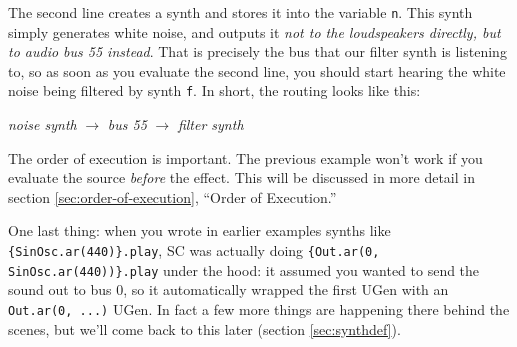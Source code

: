 The second line creates a synth and stores it into the variable \texttt{n}. This synth simply generates white noise, and outputs it \emph{not to the loudspeakers directly, but to audio bus 55 instead}. That is precisely the bus that our filter synth is listening to, so as soon as you evaluate the second line, you should start hearing the white noise being filtered by synth \texttt{f}.
In short, the routing looks like this:

\begin{center}
\emph{noise synth} $\rightarrow$ \emph{bus 55} $\rightarrow$ \emph{filter synth}
\end{center}

The order of execution is important. The previous example won't work if you evaluate the source \emph{before} the effect. This will be discussed in more detail in section \ref{sec:order-of-execution}, ``Order of Execution.''

One last thing: when you wrote in earlier examples synths like \texttt{\{SinOsc.ar(440)\}.play}, SC was actually doing \texttt{\{Out.ar(0, SinOsc.ar(440))\}.play} under the hood: it assumed you wanted to send the sound out to bus 0, so it automatically wrapped the first UGen with an \texttt{Out.ar(0, ...)} UGen. In fact a few more things are happening there behind the scenes, but we'll come back to this later (section \ref{sec:synthdef}).